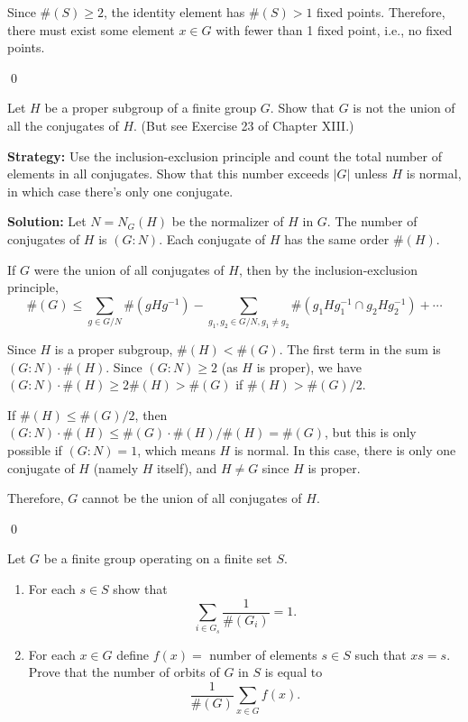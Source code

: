 Since $\#(S) \geq 2$, the identity element has $\#(S) > 1$ fixed points. Therefore, there must exist some element $x \in G$ with fewer than 1 fixed point, i.e., no fixed points.


\qed
\begin{problembox}
Let $H$ be a proper subgroup of a finite group $G$. Show that $G$ is not the union of all the conjugates of $H$. (But see Exercise 23 of Chapter XIII.)
\end{problembox}

\noindent\textbf{Strategy:} Use the inclusion-exclusion principle and count the total number of elements in all conjugates. Show that this number exceeds $|G|$ unless $H$ is normal, in which case there's only one conjugate.

\noindent\textbf{Solution:} Let $N = N_G(H)$ be the normalizer of $H$ in $G$. The number of conjugates of $H$ is $(G : N)$. Each conjugate of $H$ has the same order $\#(H)$.

If $G$ were the union of all conjugates of $H$, then by the inclusion-exclusion principle,
\[\#(G) \leq \sum_{g \in G/N} \#(gHg^{-1}) - \sum_{g_1, g_2 \in G/N, g_1 \neq g_2} \#(g_1Hg_1^{-1} \cap g_2Hg_2^{-1}) + \cdots\]

Since $H$ is a proper subgroup, $\#(H) < \#(G)$. The first term in the sum is $(G : N) \cdot \#(H)$. Since $(G : N) \geq 2$ (as $H$ is proper), we have $(G : N) \cdot \#(H) \geq 2\#(H) > \#(G)$ if $\#(H) > \#(G)/2$.

If $\#(H) \leq \#(G)/2$, then $(G : N) \cdot \#(H) \leq \#(G) \cdot \#(H)/\#(H) = \#(G)$, but this is only possible if $(G : N) = 1$, which means $H$ is normal. In this case, there is only one conjugate of $H$ (namely $H$ itself), and $H \neq G$ since $H$ is proper.

Therefore, $G$ cannot be the union of all conjugates of $H$.


\qed
\begin{problembox}
Let $G$ be a finite group operating on a finite set $S$.
\begin{enumerate}[label=(\alph*)]
\item For each $s \in S$ show that 
\[\sum_{i \in G_s} \frac{1}{\#(G_i)} = 1.\]
\item For each $x \in G$ define $f(x) = $ number of elements $s \in S$ such that $xs = s$. Prove that the number of orbits of $G$ in $S$ is equal to 
\[\frac{1}{\#(G)} \sum_{x \in G} f(x).\]
\end{enumerate}
\end{problembox}

